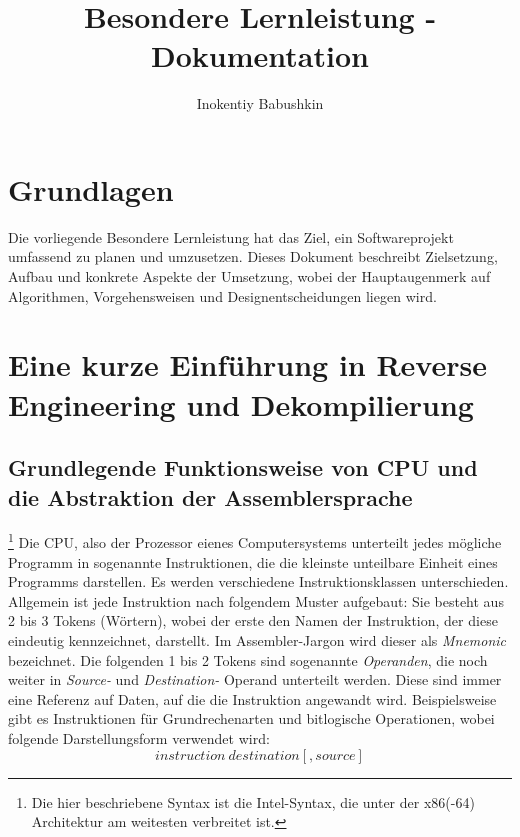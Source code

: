 \documentclass[11pt]{article} %
\title{Besondere Lernleistung - Dokumentation}
\author{Inokentiy Babushkin}
\begin{document}
\maketitle
\tableofcontents

\section{Grundlagen}
Die vorliegende Besondere Lernleistung hat das Ziel, ein Softwareprojekt
umfassend zu planen und umzusetzen.
Dieses Dokument beschreibt Zielsetzung, Aufbau und konkrete Aspekte der Umsetzung,
wobei der Hauptaugenmerk auf Algorithmen, Vorgehensweisen und Designentscheidungen liegen wird.

\section{Eine kurze Einführung in Reverse Engineering und Dekompilierung}
\subsection{Grundlegende Funktionsweise von CPU und die Abstraktion der Assemblersprache}\footnote{
		Die hier beschriebene Syntax ist die Intel-Syntax, die unter der x86(-64)
		Architektur am weitesten verbreitet ist.}
Die CPU, also der Prozessor eienes Computersystems unterteilt jedes mögliche Programm in sogenannte
Instruktionen, die die kleinste unteilbare Einheit eines Programms darstellen. Es werden
verschiedene Instruktionsklassen unterschieden. Allgemein ist jede Instruktion nach folgendem Muster
aufgebaut: Sie besteht aus 2 bis 3 Tokens (Wörtern), wobei der erste den Namen der Instruktion, der
diese eindeutig kennzeichnet, darstellt. Im Assembler-Jargon wird dieser als \textit{Mnemonic}
bezeichnet. Die folgenden 1 bis 2 Tokens sind sogenannte \textit{Operanden}, die noch weiter in
\textit{Source-} und \textit{Destination-} Operand unterteilt werden. Diese sind immer
eine Referenz auf Daten, auf die die Instruktion angewandt wird. Beispielsweise gibt es
Instruktionen für Grundrechenarten und bitlogische Operationen, wobei folgende Darstellungsform
verwendet wird: $$ instruction\ destination[, source]$$
\end{document}
